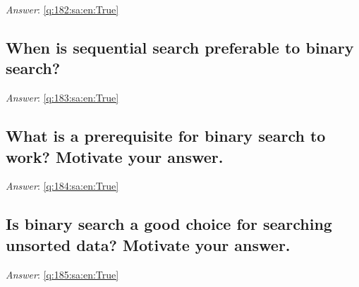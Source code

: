 \documentclass[a4paper,11pt,oneside]{article}
\begin{document}
\begin{sloppypar}
\vspace{2cm}

\noindent\makebox[\textwidth]{\hrulefill}

\vspace{1cm}

\textit{Answer}: \autoref{q:182:sa:en:True}



\subsection{When is sequential search preferable to binary search?}

\label{q:183:sa:en:False}

\vspace{2cm}

\noindent\makebox[\textwidth]{\hrulefill}

\vspace{1cm}

\textit{Answer}: \autoref{q:183:sa:en:True}



\subsection{What is a prerequisite for binary search to work? Motivate your answer.}

\label{q:184:sa:en:False}

\vspace{2cm}

\noindent\makebox[\textwidth]{\hrulefill}

\vspace{1cm}

\textit{Answer}: \autoref{q:184:sa:en:True}



\subsection{Is binary search a good choice for searching unsorted data? Motivate your answer.}

\label{q:185:sa:en:False}

\vspace{2cm}

\noindent\makebox[\textwidth]{\hrulefill}

\vspace{1cm}

\textit{Answer}: \autoref{q:185:sa:en:True}




\end{sloppypar}
\end{document}
